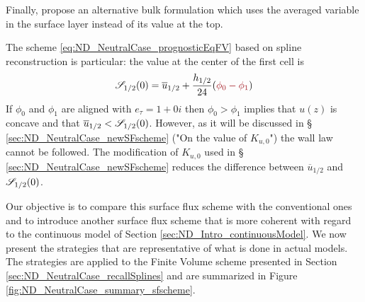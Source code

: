 Finally, \cite{nishizawa_surface_2018} propose an alternative
bulk formulation which uses the averaged variable in the surface layer
instead of its value at the top.
\begin{remark}
The scheme \eqref{eq:ND_NeutralCase_prognosticEqFV} based
on spline reconstruction is particular:
	the value at the center of the first cell is
		\begin{equation}
			{\cal S}_{1/2}(0) = \overline{u}_{1/2}
			+ \frac{h_{1/2}}{24} (\emphase{\phi_0-\phi_1})
		\end{equation}
 If $\phi_0$ and $\phi_1$ are aligned with $e_\tau=1+0i$ then
	$\phi_0 > \phi_1$ implies that $u(z)$ is concave and
	that $\overline{u}_{1/2} < {\cal S}_{1/2}(0)$.
	However, as it will be discussed in \S
	\ref{sec:ND_NeutralCase_newSFscheme}
	("On the value of $K_{u,0}$")
	the wall law cannot be followed.
	The modification of $K_{u,0}$ used in \S
	\ref{sec:ND_NeutralCase_newSFscheme} reduces
	the difference between $\overline{u}_{1/2}$
	and ${\cal S}_{1/2}(0)$.
\end{remark}
%
Our objective is to compare this surface flux scheme with the
conventional ones
and to introduce another surface flux scheme that is more coherent
with regard to the continuous model of Section
\ref{sec:ND_Intro_continuousModel}.
We now present the strategies that are representative of
what is done in actual models. The strategies are applied to
the Finite Volume scheme presented in Section
\ref{sec:ND_NeutralCase_recallSplines} and are
summarized in Figure \ref{fig:ND_NeutralCase_summary_sfscheme}.
